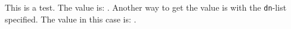 \documentclass{article}
\begin{document}

    This is a test. The value is: .
    Another way to get the value is with the \texttt{dn}-list specified.
    The value in this case is: .
\end{document}
